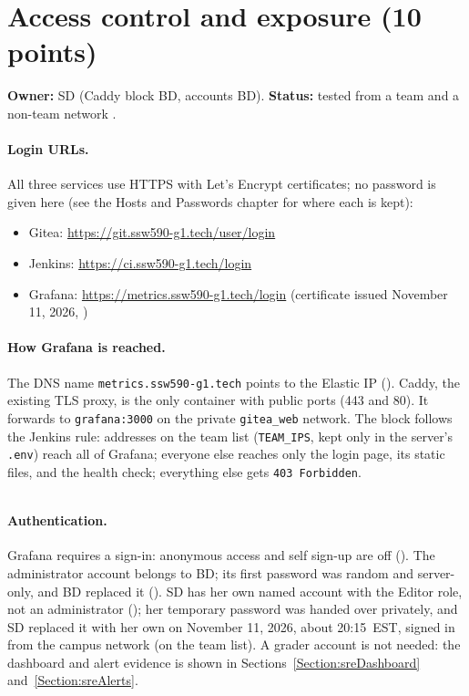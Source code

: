 \section{Access control and exposure (10 points)}\label{Section:sreAccess}
\textbf{Owner:} SD (Caddy block BD, accounts BD). \textbf{Status:} tested from a team and a non-team network \StatusPass.

\paragraph{Login URLs.} All three services use HTTPS with Let's Encrypt certificates; no password is given here
(see the Hosts and Passwords chapter for where each is kept):
\begin{itemize}[nosep]
  \item Gitea: \url{https://git.ssw590-g1.tech/user/login}
  \item Jenkins: \url{https://ci.ssw590-g1.tech/login}
  \item Grafana: \url{https://metrics.ssw590-g1.tech/login} (certificate issued November 11, 2026, )
\end{itemize}

\paragraph{How Grafana is reached.} The DNS name \texttt{metrics.ssw590-g1.tech} points to the Elastic IP ().
Caddy, the existing TLS proxy, is the only container with public ports (443 and 80). It forwards to \texttt{grafana:3000}
on the private \texttt{gitea\_web} network. The block follows the Jenkins rule: addresses on the team list
(\texttt{TEAM\_IPS}, kept only in the server's \texttt{.env}) reach all of Grafana; everyone else reaches only the login
page, its static files, and the health check; everything else gets \texttt{403 Forbidden}.

\begin{longlisting}
\inputminted[fontsize=\scriptsize]{text}{config/monitoring/Caddyfile.metrics-block.txt}
\caption{Caddy site block for Grafana, as applied on the server (\texttt{infra/monitoring/Caddyfile.metrics-block.txt}).}
\label{Listing:ESreCaddy}
\end{longlisting}

\paragraph{Authentication.} Grafana requires a sign-in: anonymous access and self sign-up are off ().
The administrator account belongs to BD; its first password was random and server-only, and BD replaced it ().
SD has her own named account with the Editor role, not an administrator (); her temporary password was handed
over privately, and SD replaced it with her own on November 11, 2026, about 20:15~EST, signed in from the campus network (on the team list). A grader account is not needed: the dashboard and
alert evidence is shown in Sections~\ref{Section:sreDashboard} and~\ref{Section:sreAlerts}.

